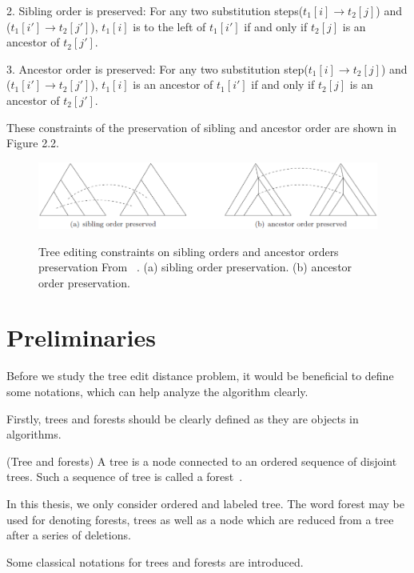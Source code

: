 2. Sibling order is preserved: For any two substitution steps($t_1[i] \to t_2[j]$) and ($t_1[i'] \to t_2[j']$), $t_1[i]$ is to the left of $t_1[i']$ if and only if $t_2[j]$ is an ancestor of $t_2[j']$.

3. Ancestor order is preserved: For any two substitution step($t_1[i] \to t_2[j]$) and ($t_1[i'] \to t_2[j']$), $t_1[i]$ is an ancestor of $t_1[i']$ if and only if $t_2[j]$ is an ancestor of $t_2[j']$.

These constraints of the preservation of sibling and ancestor order are shown in Figure 2.2.

\begin{figure}
		\centering
		\includegraphics[width=14cm,clip]{Figures/TreeEditingOperationConstraint}
		\label{Sibling orders and ancestor orders preservation} 
		\caption{Tree editing constraints on sibling orders and ancestor orders preservation From ~\cite{chen2015review}. (a) sibling order preservation. (b) ancestor order preservation.}
\end{figure}

\section{Preliminaries}
Before we study the tree edit distance problem, it would be beneficial to define some notations, which can help analyze the algorithm clearly. 

Firstly, trees and forests should be clearly defined as they are objects in algorithms. 

\begin{definition}
(Tree and forests)
A tree is a node connected to an ordered sequence of disjoint trees. Such a sequence of tree is called a forest~\cite{dulucq2005decomposition}. 
\end{definition}

In this thesis, we only consider ordered and labeled tree. The word forest may be used for denoting forests, trees as well as a node which are reduced from a tree after a series of deletions. 

Some classical notations for trees and forests are introduced.  

